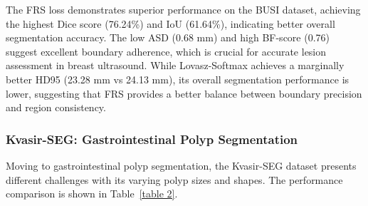 \documentclass[review]{elsarticle}
\begin{document}
The FRS loss demonstrates superior performance on the BUSI dataset, achieving the highest Dice score (76.24\%) and IoU (61.64\%), indicating better overall segmentation accuracy. The low ASD (0.68 mm) and high BF-score (0.76) suggest excellent boundary adherence, which is crucial for accurate lesion assessment in breast ultrasound. While Lovasz-Softmax achieves a marginally better HD95 (23.28 mm vs 24.13 mm), its overall segmentation performance is lower, suggesting that FRS provides a better balance between boundary precision and region consistency.

\subsubsection{Kvasir-SEG: Gastrointestinal Polyp Segmentation}
Moving to gastrointestinal polyp segmentation, the Kvasir-SEG dataset presents different challenges with its varying polyp sizes and shapes. The performance comparison is shown in Table~\ref{table 2}.
\end{document}
